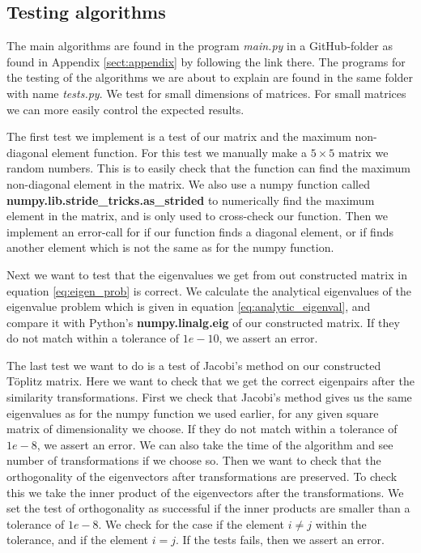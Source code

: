 \documentclass[12pt,a4paper,english]{article}
\begin{document}
\subsection{Testing algorithms}
\label{sect:testing}
The main algorithms are found in the program \textit{main.py} in a GitHub-folder as found in Appendix \ref{sect:appendix} by following the link there. The programs for the testing of the algorithms we are about to explain are found in the same folder with name \textit{tests.py}. We test for small dimensions of matrices. For small matrices we can more easily control the expected results.

The first test we implement is a test of our matrix and the maximum non-diagonal element function. For this test we manually make a $5\times5$ matrix we random numbers. This is to easily check that the function can find the maximum non-diagonal element in the matrix. We also use a numpy function called \textbf{numpy.lib.stride\_tricks.as\_strided} to numerically find the maximum element in the matrix, and is only used to cross-check our function. Then we implement an error-call for if our function finds a diagonal element, or if finds another element which is not the same as for the numpy function.

Next we want to test that the eigenvalues we get from out constructed matrix in equation \ref{eq:eigen_prob} is correct. We calculate the analytical eigenvalues of the eigenvalue problem which is given in equation \ref{eq:analytic_eigenval}, and compare it with Python's \textbf{numpy.linalg.eig} of our constructed matrix. If they do not match within a tolerance of $1e-10$, we assert an error.

The last test we want to do is a test of Jacobi's method on our constructed Töplitz matrix. Here we want to check that we get the correct eigenpairs after the similarity transformations. First we check that Jacobi's method gives us the same eigenvalues as for the numpy function we used earlier, for any given square matrix of dimensionality we choose. If they do not match within a tolerance of $1e-8$, we assert an error. We can also take the time of the algorithm and see number of transformations if we choose so. Then we want to check that the orthogonality of the eigenvectors after transformations are preserved. To check this we take the inner product of the eigenvectors after the transformations. We set the test of orthogonality as successful if the inner products are smaller than a tolerance of $1e-8$. We check for the case if the element $i\neq j$ within the tolerance, and if the element $i=j$. If the tests fails, then we assert an error.
\end{document}

